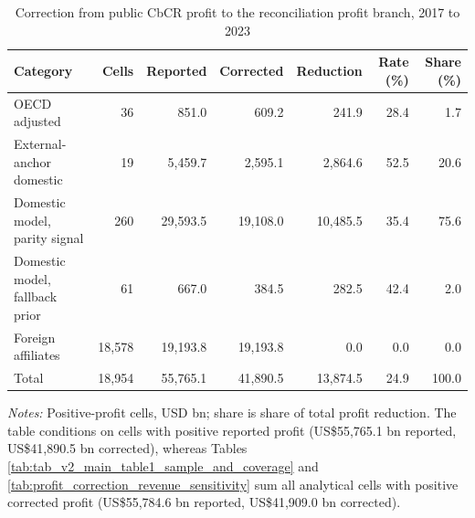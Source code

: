 \begin{table}[H]
\centering
\footnotesize
\setlength{\tabcolsep}{3pt}
\caption[Profit-base correction]{Correction from public CbCR profit to the reconciliation profit branch, 2017 to 2023}
\label{tab:profit_correction_effects}
\begin{tabular}{@{}>{\raggedright\arraybackslash}p{4.2cm}rrrrrr@{}}
\toprule
Category & Cells & Reported & Corrected & Reduction & Rate (\%) & Share (\%) \\
\midrule
OECD adjusted &     36 &    851.0 &    609.2 &    241.9 & 28.4 &   1.7 \\
External-anchor domestic &     19 &  5,459.7 &  2,595.1 &  2,864.6 & 52.5 &  20.6 \\
Domestic model, parity signal &    260 & 29,593.5 & 19,108.0 & 10,485.5 & 35.4 &  75.6 \\
Domestic model, fallback prior &     61 &    667.0 &    384.5 &    282.5 & 42.4 &   2.0 \\
Foreign affiliates & 18,578 & 19,193.8 & 19,193.8 &      0.0 &  0.0 &   0.0 \\
\midrule
Total & 18,954 & 55,765.1 & 41,890.5 & 13,874.5 & 24.9 & 100.0 \\
\bottomrule
\end{tabular}

\vspace{0.35em}
\noindent\begin{minipage}{\textwidth}
\footnotesize\raggedright\textit{Notes:} Positive-profit cells, USD bn; share is share of total profit reduction. The table conditions on cells with positive reported profit (US\$55,765.1 bn reported, US\$41,890.5 bn corrected), whereas Tables \ref{tab:tab_v2_main_table1_sample_and_coverage} and \ref{tab:profit_correction_revenue_sensitivity} sum all analytical cells with positive corrected profit (US\$55,784.6 bn reported, US\$41,909.0 bn corrected).
\end{minipage}
\end{table}

